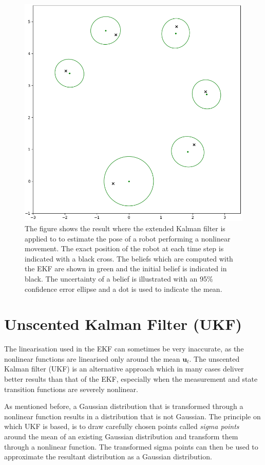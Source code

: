 \documentclass[12pt,oneside,openany,a4paper, %
afrikaans,english,
]{memoir}
\numberwithin{equation}{chapter}
\begin{document}
{\begin{figure}[H]
  \includegraphics[width=0.7\linewidth]{Figures/result_EKF.png}
  \centering
  \caption[The result where the EKF is applied to solve a nonlinear localisation problem]{The figure shows the result where the extended Kalman filter is applied to to estimate the pose of a robot performing a nonlinear movement. The exact position of the robot at each time step is indicated with a black cross. The beliefs which are computed with the EKF are shown in green and the initial belief is indicated in black. The uncertainty of a belief is illustrated with an 95\% confidence error ellipse and a dot is used to indicate the mean.}

\label{fig:resultEKF}
\end{figure}


\section{Unscented Kalman Filter (UKF)}\label{sec:UKF}
The linearisation used in the EKF can sometimes be very inaccurate, as the nonlinear functions are linearised only around the mean $\bm{u}_t$. The unscented Kalman filter (UKF) is an alternative approach which in many cases deliver better results than that of the EKF, especially when the measurement and state transition functions are severely nonlinear.

As mentioned before, a Gaussian distribution that is transformed through a nonlinear function results in a distribution that is not Gaussian. The principle on which UKF is based, is to draw carefully chosen points called \textit{sigma points} around the mean of an existing Gaussian distribution and transform them through a nonlinear function. The transformed sigma points can then be used to approximate the resultant distribution as a Gaussian distribution.

}
\end{document}
